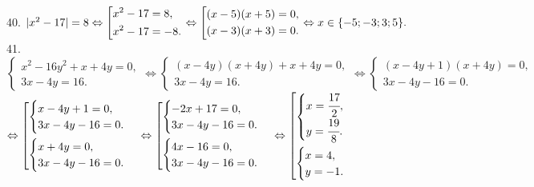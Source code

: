 40. $|x^2-17|=8\Leftrightarrow\left[\begin{gathered} x^2-17=8,\hfill\\
      x^2-17=-8.\hfill \end{gathered}\right.\Leftrightarrow\left[\begin{gathered} (x-5)(x+5)=0,\hfill\\
      (x-3)(x+3)=0.\hfill \end{gathered}\right. \Leftrightarrow x\in\{-5; -3; 3; 5\}.$\\
41. $\begin{cases}
x^2-16y^2+x+4y=0,\\
3x-4y=16.
\end{cases}\Leftrightarrow\begin{cases}
(x-4y)(x+4y)+x+4y=0,\\
3x-4y=16.
\end{cases}\Leftrightarrow\begin{cases}
(x-4y+1)(x+4y)=0,\\
3x-4y-16=0.
\end{cases}$\\$\Leftrightarrow \left[
      \begin{gathered} \begin{cases}x-4y+1=0,\\3x-4y-16=0.\end{cases}\hfill\\
      \begin{cases}x+4y=0,\\3x-4y-16=0.\end{cases}\hfill \end{gathered}\right.\Leftrightarrow \left[
      \begin{gathered} \begin{cases}-2x+17=0,\\3x-4y-16=0.\end{cases}\hfill\\
      \begin{cases}4x-16=0,\\3x-4y-16=0.\end{cases}\hfill \end{gathered}\right.\Leftrightarrow \left[
      \begin{gathered} \begin{cases}x=\cfrac{17}{2},\\y=\cfrac{19}{8}.\end{cases}\hfill\\
      \begin{cases}x=4,\\y=-1.\end{cases}\hfill \end{gathered}\right.$\\
